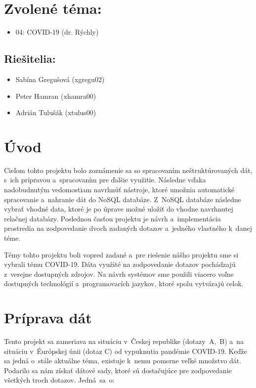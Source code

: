 \documentclass [11pt, a4paper]{article}
\begin{document}
\section*{Zvolené téma:} 
\begin{itemize}[noitemsep]
\item 04: COVID-19 (dr. Rýchly)
\end{itemize}


\subsection*{Riešitelia:}
\begin{itemize}[noitemsep]
\item Sabína Gregušová (xgregu02)
\item Peter Hamran (xhamra00)
\item Adrián Tulušák (xtulus00)
\end{itemize}

\section*{Úvod}
Cieľom tohto projektu bolo zoznámenie sa so spracovaním neštruktúrovaných dát, s~ich prípravou a~spracovaním pre ďalšie využitie. Následne vďaka nadobudnutým vedomostiam navrhnúť nástroje, ktoré umožnia automatické spracovanie a~nahranie dát do NoSQL databáze. Z~NoSQL databáze následne vybrať vhodné data, ktoré je po úprave možné uložiť do vhodne navrhnutej relačnej databázy. Poslednou časťou projektu je návrh a~implementácia prostredia na zodpovedanie dvoch zadaných dotazov a~jedného vlastného k~danej téme. 

Témy tohto projektu boli vopred zadané a~pre riešenie nášho projektu sme si vybrali tému COVID-19. Dáta využité na zodpovedanie dotazov pochádzajú z~verejne dostupných zdrojov. Na návrh systémov sme použili viacero voľne dostupných technológií a~programovacích jazykov, ktoré spolu vytvárajú celok. 
\section*{Príprava dát}

Tento projekt sa zameriava na situáciu v~Českej republike (dotazy~A,~B) a~na situáciu v~Éurópskej únii (dotaz C) od vypuknutia pandémie COVID-19. Keďže sa jedná o~stále aktuálne téma, existuje k~nemu pomerne veľké množstvo dát. Podarilo sa nám získať dátové sady, ktoré sú dostačujúce pre zodpovedanie všetkých troch dotazov. Jedná~sa~o:
\end{document}
